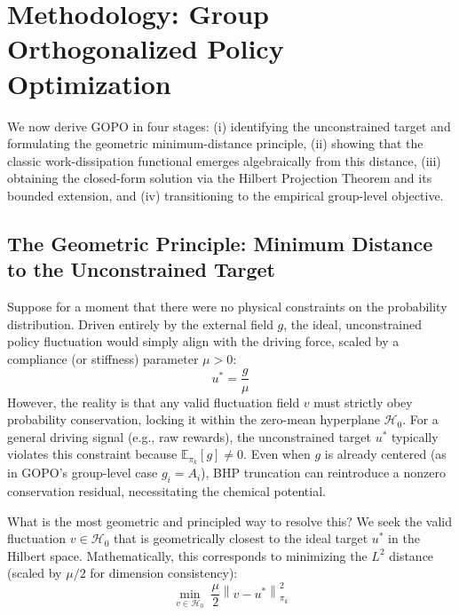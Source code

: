 \documentclass[11pt]{article}
\theoremstyle{definition}
\theoremstyle{remark}
\newcommand{\E}{\mathbb{E}}
\newcommand{\pik}{\pi_k}
\begin{document}
\section{Methodology: Group Orthogonalized Policy Optimization}
\label{sec:method}

We now derive GOPO in four stages: (i) identifying the unconstrained target and formulating the geometric minimum-distance principle, (ii) showing that the classic work-dissipation functional emerges algebraically from this distance, (iii) obtaining the closed-form solution via the Hilbert Projection Theorem and its bounded extension, and (iv) transitioning to the empirical group-level objective.

\subsection{The Geometric Principle: Minimum Distance to the Unconstrained Target}
\label{subsec:geometric_principle}

Suppose for a moment that there were no physical constraints on the probability distribution. Driven entirely by the external field $g$, the ideal, unconstrained policy fluctuation would simply align with the driving force, scaled by a compliance (or stiffness) parameter $\mu > 0$:
\begin{equation}
    u^* = \frac{g}{\mu}
\end{equation}
However, the reality is that any valid fluctuation field $v$ must strictly obey probability conservation, locking it within the zero-mean hyperplane $\mathcal{H}_0$. For a general driving signal (e.g., raw rewards), the unconstrained target $u^*$ typically violates this constraint because $\E_{\pik}[g] \neq 0$. Even when $g$ is already centered (as in GOPO's group-level case $g_i = A_i$), BHP truncation can reintroduce a nonzero conservation residual, necessitating the chemical potential.

What is the most geometric and principled way to resolve this? We seek the valid fluctuation $v \in \mathcal{H}_0$ that is geometrically closest to the ideal target $u^*$ in the Hilbert space. Mathematically, this corresponds to minimizing the $L^2$ distance (scaled by $\mu/2$ for dimension consistency):
\begin{equation}
\label{eq:min_distance}
    \min_{v \in \mathcal{H}_0} \; \frac{\mu}{2} \left\| v - u^* \right\|^2_{\pik}
\end{equation}
\end{document}
